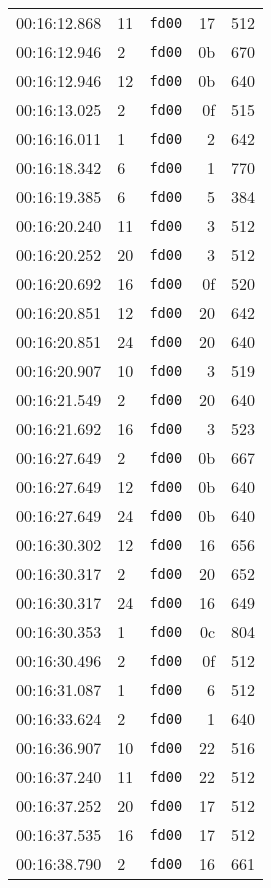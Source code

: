 \documentclass{article}
\begin{document}
\begin{longtable}{lllrr}
00:16:12.868 & 11 & \texttt{fd00} & 17 & 512 \\
00:16:12.946 & 2 & \texttt{fd00} & 0b & 670 \\
00:16:12.946 & 12 & \texttt{fd00} & 0b & 640 \\
00:16:13.025 & 2 & \texttt{fd00} & 0f & 515 \\
00:16:16.011 & 1 & \texttt{fd00} & 2 & 642 \\
00:16:18.342 & 6 & \texttt{fd00} & 1 & 770 \\
00:16:19.385 & 6 & \texttt{fd00} & 5 & 384 \\
00:16:20.240 & 11 & \texttt{fd00} & 3 & 512 \\
00:16:20.252 & 20 & \texttt{fd00} & 3 & 512 \\
00:16:20.692 & 16 & \texttt{fd00} & 0f & 520 \\
00:16:20.851 & 12 & \texttt{fd00} & 20 & 642 \\
00:16:20.851 & 24 & \texttt{fd00} & 20 & 640 \\
00:16:20.907 & 10 & \texttt{fd00} & 3 & 519 \\
00:16:21.549 & 2 & \texttt{fd00} & 20 & 640 \\
00:16:21.692 & 16 & \texttt{fd00} & 3 & 523 \\
00:16:27.649 & 2 & \texttt{fd00} & 0b & 667 \\
00:16:27.649 & 12 & \texttt{fd00} & 0b & 640 \\
00:16:27.649 & 24 & \texttt{fd00} & 0b & 640 \\
00:16:30.302 & 12 & \texttt{fd00} & 16 & 656 \\
00:16:30.317 & 2 & \texttt{fd00} & 20 & 652 \\
00:16:30.317 & 24 & \texttt{fd00} & 16 & 649 \\
00:16:30.353 & 1 & \texttt{fd00} & 0c & 804 \\
00:16:30.496 & 2 & \texttt{fd00} & 0f & 512 \\
00:16:31.087 & 1 & \texttt{fd00} & 6 & 512 \\
00:16:33.624 & 2 & \texttt{fd00} & 1 & 640 \\
00:16:36.907 & 10 & \texttt{fd00} & 22 & 516 \\
00:16:37.240 & 11 & \texttt{fd00} & 22 & 512 \\
00:16:37.252 & 20 & \texttt{fd00} & 17 & 512 \\
00:16:37.535 & 16 & \texttt{fd00} & 17 & 512 \\
00:16:38.790 & 2 & \texttt{fd00} & 16 & 661 \\

\end{longtable}
\end{document}
